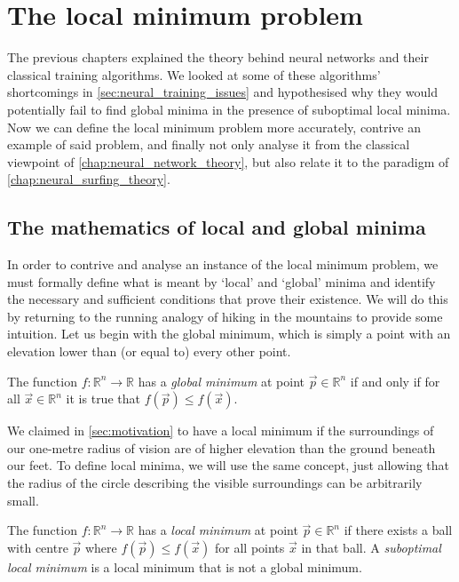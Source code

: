 \chapter{The local minimum problem}
\label{chap:local_minimum_problem}
The previous chapters explained the theory behind neural networks and their classical training algorithms. 
We looked at some of these algorithms' shortcomings in \ref{sec:neural_training_issues} and hypothesised why they would potentially fail to find global minima in the presence of suboptimal local minima.
Now we can define the local minimum problem more accurately, contrive an example of said problem, and finally not only analyse it from the classical viewpoint of \ref{chap:neural_network_theory}, but also relate it to the paradigm of \ref{chap:neural_surfing_theory}.

\section{The mathematics of local and global minima}
In order to contrive and analyse an instance of the local minimum problem, we must formally define what is meant by `local' and `global' minima and identify the necessary and sufficient conditions that prove their existence.
We will do this by returning to the running analogy of hiking in the mountains to provide some intuition.
Let us begin with the global minimum, which is simply a point with an elevation lower than (or equal to) every other point.
\begin{definition}
    \label{def:global_minimum}
    The function $f: \mathbb{R}^n \rightarrow \mathbb{R}$ has a \textit{global minimum} at point
    $\vec{p} \in \mathbb{R}^n$
    if and only if for all
    $\vec{x} \in \mathbb{R}^n$
    it is true that
    $f(\vec{p}) \leq f(\vec{x})$.
\end{definition}

We claimed in \ref{sec:motivation} to have a local minimum if the surroundings of our one-metre radius of vision are of higher elevation than the ground beneath our feet.
To define local minima, we will use the same concept, just allowing that the radius of the circle describing the visible surroundings can be arbitrarily small.
\begin{definition}
    \label{def:local_minimum}
    The function $f: \mathbb{R}^n \rightarrow \mathbb{R}$ has a \textit{local minimum} at point
    $\vec{p} \in \mathbb{R}^n$
    if there exists a ball with centre
    $\vec{p}$
    where
    $f(\vec{p}) \leq f(\vec{x})$
    for all points $\vec{x}$ in that ball.
    A \textit{suboptimal local minimum} is a local minimum that is not a global minimum.
\end{definition}

